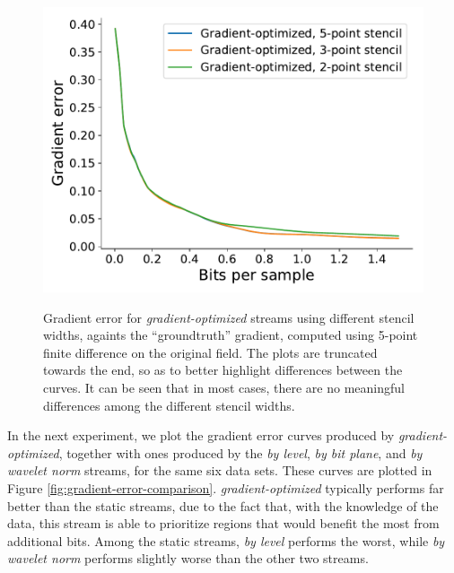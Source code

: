 \begin{figure}[h]
	{\includegraphics[width=0.48\linewidth]{img/gradient/compare-stencils/gradient-optimized-velocityz.pdf}}
	\caption{Gradient error for \emph{gradient-optimized} streams using different stencil widths,
	againts the ``groundtruth'' gradient, computed using 5-point finite difference on the original
	field. The plots are truncated towards the end, so as to better highlight differences between the
	curves. It can be seen that in most cases, there are no meaningful differences among the different
	stencil widths.}
	\label{fig:gradient-stencil-comparison}
\end{figure}

In the next experiment, we plot the gradient error curves produced by \emph{gradient-optimized},
together with ones produced by the \emph{by level}, \emph{by bit plane}, and \emph{by wavelet norm}
streams, for the same six data sets. These curves are plotted in Figure
\ref{fig:gradient-error-comparison}. \emph{gradient-optimized} typically performs far better than
the static streams, due to the fact that, with the knowledge of the data, this stream is able to
prioritize regions that would benefit the most from additional bits. Among the static streams,
\emph{by level} performs the worst, while \emph{by wavelet norm} performs slightly worse than the
other two streams. 

